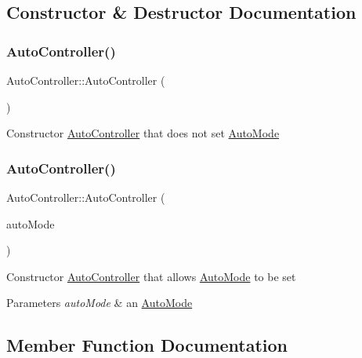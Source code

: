 \subsection{Constructor \& Destructor Documentation}
\mbox{\label{class_auto_controller_aaa1564aeb5d8577d7d8e973daedfd3ae}} 
\subsubsection{\texorpdfstring{Auto\+Controller()}{AutoController()}\hspace{0.1cm}{\footnotesize\ttfamily [1/2]}}
{\footnotesize\ttfamily Auto\+Controller\+::\+Auto\+Controller (\begin{DoxyParamCaption}{ }\end{DoxyParamCaption})}

Constructor \hyperlink{class_auto_controller}{Auto\+Controller} that does not set \hyperlink{class_auto_mode}{Auto\+Mode} \mbox{\label{class_auto_controller_a8fddf9163735e6fc44572e9f59116084}} 
\subsubsection{\texorpdfstring{Auto\+Controller()}{AutoController()}\hspace{0.1cm}{\footnotesize\ttfamily [2/2]}}
{\footnotesize\ttfamily Auto\+Controller\+::\+Auto\+Controller (\begin{DoxyParamCaption}\item[{\hyperlink{class_auto_mode}{Auto\+Mode} $\ast$}]{auto\+Mode }\end{DoxyParamCaption})}

Constructor \hyperlink{class_auto_controller}{Auto\+Controller} that allows \hyperlink{class_auto_mode}{Auto\+Mode} to be set 
\begin{DoxyParams}{Parameters}
{\em auto\+Mode} & an \hyperlink{class_auto_mode}{Auto\+Mode} \\
\hline
\end{DoxyParams}


\subsection{Member Function Documentation}
\mbox{\label{class_auto_controller_a8b7b16e449078e1818b4bc302f97da07}} 
